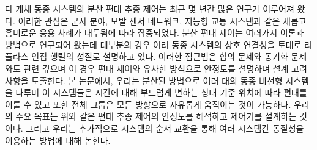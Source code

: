 \documentclass[11pt, a4paper, oneside, openany, reqno]{book}
\theoremstyle{definition}
\theoremstyle{remark}
\numberwithin{equation}{chapter} %
\begin{document}



\backmatter

\newpage\thispagestyle{empty}\mbox{}\newpage

\begin{KoreanAbstract}
다 개체 동종 시스템의 분산 편대 추종 제어는 최근 몇 년간 많은 연구가 이루어져 왔다. 
이러한 관심은 군사 분야, 모발 센서 네트워크, 지능형 교통 시스템과 같은 
새롭고 흥미로운 응용 사례가 대두됨에 따라 집중되었다. 
분산 편대 제어는 여러가지 이론과 방법으로 연구되어 왔는데 
대부분의 경우 여러 동종 시스템의 상호 연결성을 토대로 라플라스 인접 행렬의 성질로 설명하고 있다.
이러한 접근법은 합의 문제와 동기화 문제와도 관련 깊으며 
이 경우 편대 제어와 유사한 방식으로 안정도를 설명하며 설계 고려 사항을 도출한다. 
본 논문에서, 우리는 분산된 방법으로 여러 대의 동종 비선형 시스템을 다루며 
이 시스템들은 시간에 대해 부드럽게 변하는 상대 기준 위치에 따라 편대를 이룰 수 있고 
또한 전체 그룹은 모든 방향으로 자유롭게 움직이는 것이 가능하다. 
우리의 주요 목표는 위와 같은 편대 추종 제어의 안정도를 해석하고 제어기를 설계하는 것이다. 
그리고 우리는 추가적으로 시스템의 순서 교환을 통해 여러 시스템간 동질성을 이용하는 방법에 대해 논한다. 
\end{KoreanAbstract}
\end{document}
